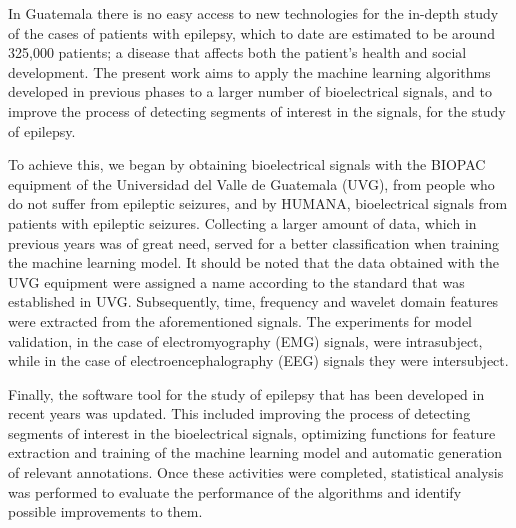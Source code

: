 In Guatemala there is no easy access to new technologies for the in-depth study of the cases of patients with epilepsy, which to date are estimated to be around 325,000 patients; a disease that affects both the patient's health and social development. 
The present work aims to apply the machine learning algorithms developed in previous phases to a larger number of bioelectrical signals, and to improve the process of detecting segments of interest in the signals, for the study of epilepsy.

To achieve this, we began by obtaining bioelectrical signals with the BIOPAC equipment of the Universidad del Valle de Guatemala (UVG), from people who do not suffer from epileptic seizures, and by HUMANA, bioelectrical signals from patients with epileptic seizures.
Collecting a larger amount of data, which in previous years was of great need, served for a better classification when training the machine learning model. It should be noted that the data obtained with the UVG equipment were assigned a name according to the standard that was established in UVG. Subsequently, time, frequency and wavelet domain features were extracted from the aforementioned signals. The experiments for model validation, in the case of electromyography (EMG) signals, were intrasubject, while in the case of electroencephalography (EEG) signals they were intersubject. 

Finally, the software tool for the study of epilepsy that has been developed in recent years was updated. This included improving the process of detecting segments of interest in the bioelectrical signals, optimizing functions for feature extraction and training of the machine learning model and automatic generation of relevant annotations. Once these activities were completed, statistical analysis was performed to evaluate the performance of the algorithms and identify possible improvements to them.